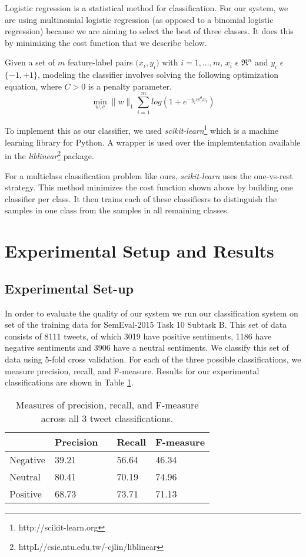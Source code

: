 \documentclass[11pt,letterpaper]{article}
\begin{document}
Logistic regression is a statistical method for classification. For our system, we are using multinomial logistic regression (as opposed to a binomial logistic regression) because we are aiming to select the best of three classes. It does this by minimizing the cost function that we describe below. 

Given a set of $m$ feature-label pairs $\big(x_{i}, y_{i} \big)$ with $i = 1,..., m$, $x_{i}$ $\epsilon$ $\Re^{n}$ and $y_{i}$ $\epsilon$ $\{-1, +1\}$, modeling the classifier involves solving the following optimization equation, where $C>0$ is a penalty parameter. 
$$ \min_{w, c}  \parallel w \parallel _{1}\sum_{i=1}^{m}log(1 + e^{-y_{i}w^ \theta x_{i}})$$

To implement this as our classifier, we used \emph{scikit-learn}\footnote{http://scikit-learn.org} which is a machine learning library for Python. A wrapper is used over the implemtentation available in the \emph{liblinear}\footnote{httpL//csie.ntu.edu.tw/-cjlin/liblinear} package. 

For a multiclass classification problem like ours, \emph{scikit-learn} uses the one-vs-rest strategy. This method minimizes the cost function shown above by building one classifier per class. It then trains each of these classifiesrs to distinguish the samples in one class from the samples in all remaining classes.

\section{Experimental Setup and Results}

\subsection{Experimental Set-up}

In order to evaluate the quality of our system we run our classification system on set of the training data for SemEval-2015 Task 10 Subtask B. This set of data consists of 8111 tweets, of which 3019 have positive sentiments, 1186 have negative sentiments and 3906 have a neutral sentiments. We classify this set of data using 5-fold cross validation. For each of the three possible classifications, we measure precision, recall, and F-measure. Results for our experimental classifications are shown in Table \ref{eval_table}.

\begin{table}
\begin{center}
\begin{tabular}{lllll}
  & \bf Precision  & & \bf Recall  & \bf F-measure  \\ \hline \hline
  Negative & 39.21          &    & 56.64           & 46.34  \\
  Neutral  & 80.41          &    & 70.19           & 74.96  \\
  Positive & 68.73          &    & 73.71           & 71.13  \\ \cline{1-5}
\end{tabular}
\end{center}
\caption{\label{eval_table}Measures of precision, recall, and F-measure across all 3 tweet classifications.}
\end{table}
\end{document}
